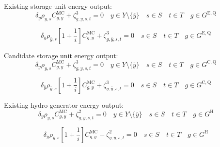 \documentclass{article}
\newcommand{\sGeneratorsHydro}{G^{\mathrm{H}}}
\newcommand{\sStorageExisting}{G^{\mathrm{E,Q}}}
\newcommand{\sStorageCandidate}{G^{\mathrm{C,Q}}}
\newcommand{\sYears}{Y}
\newcommand{\sScenarios}{S}
\newcommand{\sIntervals}{T}
\newcommand{\iGenerator}{g}
\newcommand{\iYear}{y}
\newcommand{\iYearTerminal}{\overline{\iYear}}
\newcommand{\iScenario}{s}
\newcommand{\iInterval}{t}
\newcommand{\cScenarioDuration}[1][\iYear,\iScenario]{\rho_{#1}}
\newcommand{\cMarginalCost}[1][\iGenerator,\iYear]{C^{\mathrm{MC}}_{#1}}
\newcommand{\cInterestRate}{i}
\newcommand{\cDiscountRate}[1][\iYear]{\delta_{#1}}
\newcommand{\dGeneratorEnergyOutput}[1][\iGenerator,\iYear,\iScenario,\iInterval]{\zeta_{#1}^{2}}
\newcommand{\dStorageEnergyOutput}[1][\iGenerator,\iYear,\iScenario,\iInterval]{\zeta_{#1}^{3}}
\begin{document}
Existing storage unit energy output:
\begin{equation}
\cDiscountRate\cScenarioDuration \cMarginalCost + \dStorageEnergyOutput = 0 \quad \iYear \in \sYears \setminus \{\iYearTerminal\} \quad \iScenario \in \sScenarios \quad \iInterval \in \sIntervals \quad  \iGenerator \in \sStorageExisting
\end{equation}

\begin{equation}
\cDiscountRate[\iYearTerminal] \cScenarioDuration[\iYearTerminal,\iScenario] \left[1 + \frac{1}{\cInterestRate}\right] \cMarginalCost + \dStorageEnergyOutput[\iGenerator,\iYearTerminal,\iScenario,\iInterval] = 0 \quad \iScenario \in \sScenarios \quad \iInterval \in \sIntervals \quad  \iGenerator \in \sStorageExisting
\end{equation}

Candidate storage unit energy output:
\begin{equation}
\cDiscountRate\cScenarioDuration \cMarginalCost + \dStorageEnergyOutput = 0 \quad \iYear \in \sYears \setminus \{\iYearTerminal\} \quad \iScenario \in \sScenarios \quad \iInterval \in \sIntervals \quad  \iGenerator \in \sStorageCandidate
\end{equation}

\begin{equation}
\cDiscountRate[\iYearTerminal] \cScenarioDuration[\iYearTerminal,\iScenario] \left[1 + \frac{1}{\cInterestRate}\right] \cMarginalCost + \dStorageEnergyOutput[\iGenerator, \iYearTerminal,\iScenario,\iInterval] = 0 \quad \iScenario \in \sScenarios \quad \iInterval \in \sIntervals \quad  \iGenerator \in \sStorageCandidate
\end{equation}

Existing hydro generator energy output:
\begin{equation}
\cDiscountRate\cScenarioDuration \cMarginalCost + \dGeneratorEnergyOutput = 0 \quad \iYear \in \sYears \setminus \{\iYearTerminal\} \quad \iScenario \in \sScenarios \quad \iInterval \in \sIntervals \quad \iGenerator \in \sGeneratorsHydro
\end{equation}

\begin{equation}
\cDiscountRate[\iYearTerminal] \cScenarioDuration[\iYearTerminal,\iScenario] \left[1 + \frac{1}{\cInterestRate}\right] \cMarginalCost + \dGeneratorEnergyOutput[\iGenerator,\iYearTerminal,\iScenario,\iInterval] = 0 \quad \iScenario \in \sScenarios \quad \iInterval \in \sIntervals \quad \iGenerator \in \sGeneratorsHydro
\end{equation}
\end{document}
